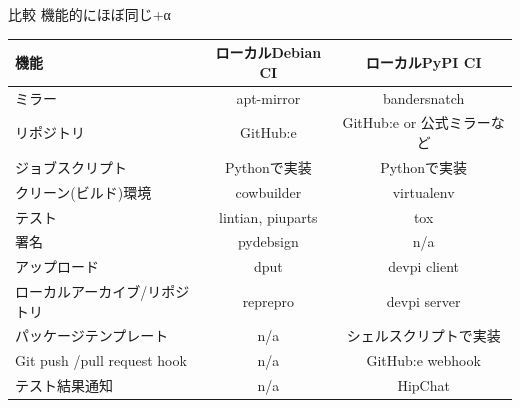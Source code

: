 \begin{frame}{比較}
  機能的にほぼ同じ+α
  \begin{center}
    {\scriptsize
  \begin{tabular}{|l|c|c|}
    \hline
    機能 & ローカルDebian CI & ローカルPyPI CI \\
    \hline
    ミラー & apt-mirror & bandersnatch \\
    リポジトリ & GitHub:e & GitHub:e or 公式ミラーなど \\
    ジョブスクリプト & Pythonで実装 & Pythonで実装 \\
    クリーン(ビルド)環境 & cowbuilder & virtualenv \\
    テスト & lintian, piuparts & tox \\
    署名 & pydebsign & n/a \\
    アップロード & dput & devpi client \\
    ローカルアーカイブ/リポジトリ & reprepro & devpi server \\
    パッケージテンプレート & n/a & シェルスクリプトで実装 \\
    Git push /pull request hook & n/a & GitHub:e webhook \\
    テスト結果通知 & n/a & HipChat \\
    \hline
  \end{tabular}}
  \end{center}
\end{frame}

